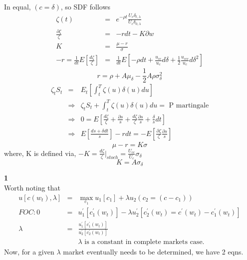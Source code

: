 \documentclass[]{article}
\begin{document}
In equal, $(c= \delta)$, so SDF follows 
\begin{eqnarray*}
\zeta(t) &=& e^{-\rho t} \frac{U_c \delta_{t,\lambda}}{U_c \delta_{0,\lambda}}\\
\frac{\partial \zeta}{\zeta} &=& -rdt - K\partial w\\
K &=& \frac{\mu - r }{\sigma}\\
-r = \frac{1}{dt} E\left[\frac{d\zeta}{\zeta}\right] &=& \frac{1}{dt}E\left[-\rho dt + \frac{u_{cc}}{u_c} d\delta + \frac{1}{2} \frac{u_{ccc}}{u_c} d\delta^2\right]
\end{eqnarray*}
\begin{equation}
r = \rho + A\mu_\delta - \frac{1}{2} A \rho \sigma_\delta^2 \tag{12}
\end{equation}
\begin{eqnarray*}
\zeta_t S_t &=& E_t\left[\int_t^T \zeta(u) \delta(u) du\right]\\
&\Rightarrow & \zeta_t S_t + \int_t^T \zeta(u) \delta(u) du = \mbox{ P martingale}\\
&\Rightarrow & 0 = E\left[\frac{d\zeta}{\zeta} + \frac{\partial s}{s} + \frac{d\zeta}{\zeta}  \frac{\partial s}{s} + \frac{\delta}{s}dt\right]\\
&\Rightarrow & E\left[\frac{ds+\delta dt}{s}\right] - rdt = -E\left[\frac{\partial \zeta}{\zeta} \frac{\partial s}{s}\right]
\end{eqnarray*}
\begin{equation}
\mu - r = K \sigma \tag{13}
\end{equation}
where, K is defined via, $-K = \frac{d\zeta}{\zeta}|_{stoch} = \frac{U_{cc}}{U_c} \sigma_\delta$\\
\begin{equation}
K = A\sigma_\delta \tag{14}
\end{equation}

\textbf{1}\\
Worth noting that 
\begin{eqnarray*}
u[c(w_t),\lambda] &=& \max_{c_1} u_1[c_1] + \lambda u_2 (c_2=(c-c_1))\\
FOC : 0 &=& u_1^\prime[c_1^\prime(w_t)]- \lambda u_2^\prime [c_2^\prime(w_t) = c^\prime(w_t) - c_1^\prime(w_t)]\\
\lambda&=& \frac{u_1^\prime [c_1^\prime(w_t)]}{u_2^\prime [c_2^\prime(w_t)]}\\
&&\mbox{$\lambda$ is a constant in complete markets case.}
\end{eqnarray*}
Now, for a given $\lambda $ market eventually needs to be determined, we have 2 eqns.\\
\end{document}
